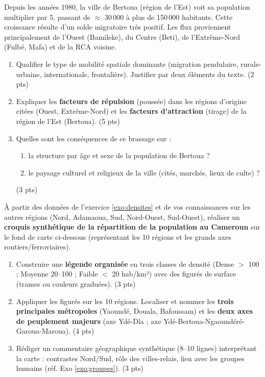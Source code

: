 \documentclass[11pt]{article}
\begin{document}
\begin{exercice}
\label{exo:mobilite}
Depuis les années 1980, la ville de Bertoua (région de l'Est) voit sa population multiplier par 5, passant de $\approx$ 30\,000 à plus de 150\,000 habitants. Cette croissance résulte d'un solde migratoire très positif. Les flux proviennent principalement de l'Ouest (Bamileke), du Centre (Beti), de l'Extrême-Nord (Fulbé, Mafa) et de la RCA voisine.

\begin{enumerate}
    \item Qualifier le type de mobilité spatiale dominante (migration pendulaire, rurale-urbaine, internationale, frontalière). Justifier par deux éléments du texte. \hfill (2 pts)
    \item Expliquer les \textbf{facteurs de répulsion} (poussée) dans les régions d'origine citées (Ouest, Extrême-Nord) et les \textbf{facteurs d'attraction} (tirage) de la région de l'Est (Bertoua). \hfill (5 pts)
    \item Quelles sont les conséquences de ce brassage sur : 
    \begin{enumerate}
        \item la structure par âge et sexe de la population de Bertoua ?
        \item le paysage culturel et religieux de la ville (cités, marchés, lieux de culte) ?
    \end{enumerate}
    \hfill (3 pts)
\end{enumerate}
\end{exercice}

\begin{exercice}
\label{exo:croquis}
À partir des données de l'exercice \ref{exo:densites} et de vos connaissances sur les autres régions (Nord, Adamaoua, Sud, Nord-Ouest, Sud-Ouest), réaliser un \textbf{croquis synthétique de la répartition de la population au Cameroun} sur le fond de carte ci-dessous (représentant les 10 régions et les grands axes routiers/ferroviaires).

\begin{enumerate}
    \item Construire une \textbf{légende organisée} en trois classes de densité (Dense $>$ 100 ; Moyenne 20--100 ; Faible $<$ 20 hab/km²) avec des figurés de surface (trames ou couleurs graduées). \hfill (3 pts)
    \item Appliquer les figurés sur les 10 régions. Localiser et nommer les \textbf{trois principales métropoles} (Yaoundé, Douala, Bafoussam) et les \textbf{deux axes de peuplement majeurs} (axe Ydé-Dla ; axe Ydé-Bertoua-Ngaoundéré-Garoua-Maroua). \hfill (4 pts)
    \item Rédiger un commentaire géographique synthétique (8--10 lignes) interprétant la carte : contrastes Nord/Sud, rôle des villes-relais, lien avec les groupes humains (réf. Exo \ref{exo:groupes}). \hfill (3 pts)
\end{enumerate}
\end{exercice}
\end{document}

